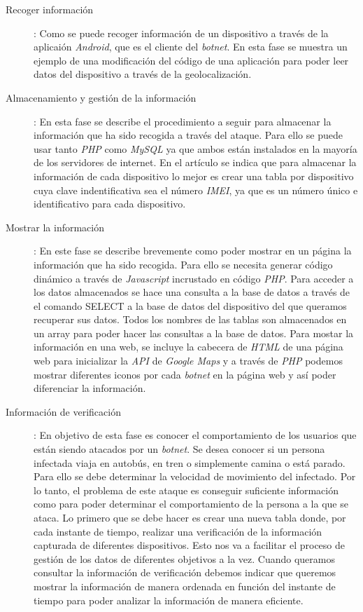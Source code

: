 \documentclass[a4paper,11pt]{report}
\begin{document}
\begin{description}
\item [Recoger información]: Como se puede recoger información de un dispositivo a través de la aplicaión \emph{Android}, que es el cliente del \emph{botnet}. En esta fase se muestra un ejemplo de una modificación del código de una aplicación para poder leer datos del dispositivo a través de la geolocalización.

\item [Almacenamiento y gestión de la información]: En esta fase se describe el procedimiento a seguir para almacenar la información que ha sido recogida a través del ataque. Para ello se puede usar tanto \emph{PHP} como \emph{MySQL} ya que ambos están instalados en la mayoría de los servidores de internet. En el artículo se indica que para almacenar la información de cada dispositivo lo mejor es crear una tabla por dispositivo cuya clave indentificativa sea el número \emph{IMEI}, ya que es un número único e identificativo para cada dispositivo.

\item [Mostrar la información]: En este fase se describe brevemente como poder mostrar en un página la información que ha sido recogida. Para ello se necesita generar código dinámico a través de \emph{Javascript} incrustado en código \emph{PHP}. Para acceder a los datos almacenados se hace una consulta a la base de datos a través de el comando SELECT a la base de datos del dispositivo del que queramos recuperar sus datos. Todos los nombres de las tablas son almacenados en un array para poder hacer las consultas a la base de datos. Para mostar la información en una web, se incluye la cabecera de \emph{HTML} de una página web para inicializar la \emph{API} de \emph{Google Maps} y a través de \emph{PHP} podemos mostrar diferentes iconos por cada \emph{botnet} en la página web y así poder diferenciar la información.

\item [Información de verificación]: En objetivo de esta fase es conocer el comportamiento de los usuarios que están siendo atacados por un \emph{botnet}. Se desea conocer si un persona infectada viaja en autobús, en tren o simplemente camina o está parado. Para ello se debe determinar la velocidad de movimiento del infectado. Por lo tanto, el problema de este ataque es conseguir suficiente información como para poder determinar el comportamiento de la persona a la que se ataca. Lo primero que se debe hacer es crear una nueva tabla donde, por cada instante de tiempo, realizar una verificación de la información capturada de diferentes dispositivos. Esto nos va a facilitar el proceso de gestión de los datos de diferentes objetivos a la vez. Cuando queramos consultar la información de verificación debemos indicar que queremos mostrar la información de manera ordenada en función del instante de tiempo para poder analizar la información de manera eficiente.


\end{description}
\end{document}
